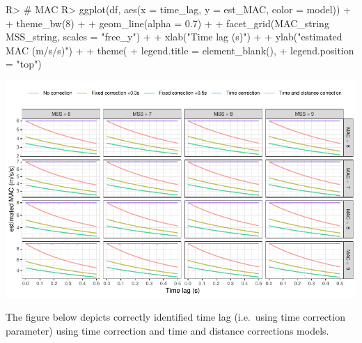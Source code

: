 \documentclass[
]{jss}
\begin{document}
\begin{CodeChunk}
\begin{CodeInput}
R> # MAC
R> ggplot(df, aes(x = time_lag, y = est_MAC, color = model)) +
+   theme_bw(8) +
+   geom_line(alpha = 0.7) +
+   facet_grid(MAC_string ~ MSS_string, scales = "free_y") +
+   xlab("Time lag (s)") +
+   ylab("estimated MAC (m/s/s)") +
+   theme(
+     legend.title = element_blank(),
+     legend.position = "top")
\end{CodeInput}


\begin{center}\includegraphics[width=1\linewidth]{paper_files/figure-latex/unnamed-chunk-41-1} \end{center}

\end{CodeChunk}

The figure below depicts correctly identified time lag (i.e.~using time correction parameter) using time correction and time and distance corrections models.
\end{document}
